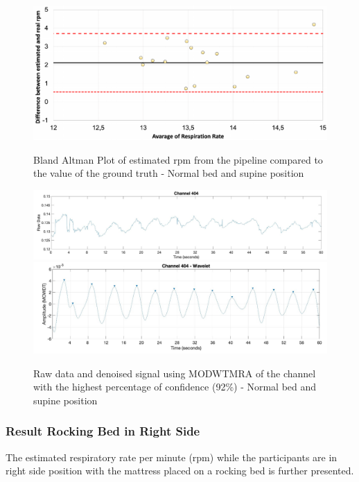 \begin{figure}[p]
  \centering
  \includegraphics[width=\textwidth]{img/balnd1.pdf}

  \caption{Bland Altman Plot of estimated rpm from the pipeline compared to the value of the ground truth - Normal bed and supine position}
  \label{fig:baln1}
  \vspace{1.5cm}
  \includegraphics[width=\textwidth]{img/404.jpg}
  \includegraphics[width=\textwidth]{img/404_wave.jpg}
\caption{Raw data and denoised signal using MODWTMRA of the channel with the highest percentage of confidence (92\%) - Normal bed and supine position}
  \label{fig:rec}
\end{figure}


\clearpage
\subsubsection{Result Rocking Bed in Right Side }  %

The estimated respiratory rate per minute (rpm) while the participants are in right side position with the mattress placed on a rocking bed is further presented. 

